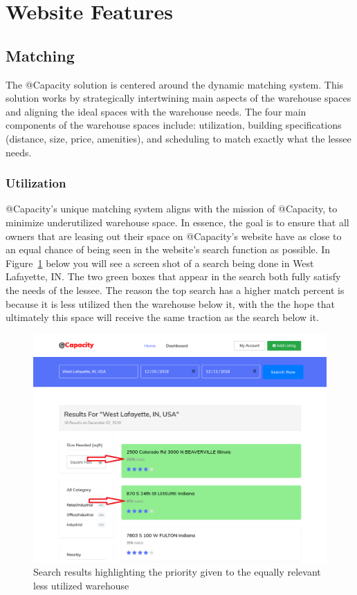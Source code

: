 \section{Website Features}
\subsection{Matching}
The @Capacity solution is centered around the dynamic matching system. This solution works by strategically intertwining main aspects of the warehouse spaces and aligning the ideal spaces with the warehouse needs. The four main components of the warehouse spaces include: utilization, building specifications (distance, size, price, amenities), and scheduling to match exactly what the lessee needs. 

\subsubsection{Utilization}
@Capacity's unique matching system aligns with the mission of @Capacity, to minimize underutilized warehouse space. In essence, the goal is to ensure that all owners that are leasing out their space on @Capacity's website have as close to an equal chance of being seen in the website's search function as possible. In Figure~\ref{fig:utilization2} below you will see a screen shot of a search being done in West Lafayette, IN. The two green boxes that appear in the search both fully satisfy the needs of the lessee. The reason the top search has a higher match percent is because it is less utilized then the warehouse below it, with the the hope that ultimately this space will receive the same traction as the search below it. 
\begin{figure}[tbh]
\centering
\includegraphics[width=.75\textwidth]{Phase_3/utilization}
\caption{Search results highlighting the priority given to the equally relevant less utilized warehouse}
\label{fig:utilization2}
\end{figure}


